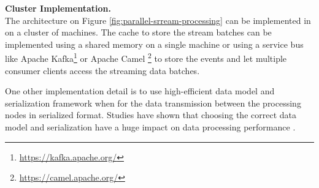 

    
\textbf{Cluster Implementation.}\\
The architecture on Figure \ref{fig:parallel-srream-processing} can be implemented in on a cluster of machines.
The cache to store the stream batches can be implemented using a shared memory on a single machine or using a service bus
like Apache Kafka\footnote{\url{https://kafka.apache.org/}} or Apache Camel \footnote{\url{https://camel.apache.org/}} to store 
the events and let multiple consumer clients access the streaming data batches.  

One other implementation detail is to use high-efficient data model and serialization framework when for the data transmission between 
the processing nodes in serialized format. Studies have shown that choosing the correct data model and serialization 
 have a huge impact on data processing performance \cite{DBLP:conf/cloud/SikdarTJ17}. 
